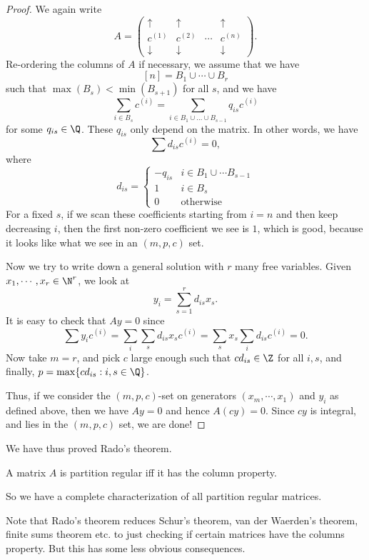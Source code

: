\documentclass[a4paper]{article}
\begin{document}
\begin{proof}
  We again write
  \[
    A =
    \begin{pmatrix}
      \uparrow & \uparrow & & \uparrow\\
      c^{(1)} & c^{(2)} & \cdots & c^{(n)}\\
      \downarrow & \downarrow & & \downarrow
    \end{pmatrix}.
  \]
  Re-ordering the columns of $A$ if necessary, we assume that we have
  \[
    [n] = B_1 \cup \cdots \cup B_r
  \]
  such that $\max(B_s) < \min(B_{s + 1})$ for all $s$, and we have
  \[
    \sum_{i \in B_s} c^{(i)} = \sum_{i \in B_1 \cup \ldots \cup B_{s - 1}} q_{is}c^{(i)}
  \]
  for some $q_{is} \in \Q$. These $q_{is}$ only depend on the matrix. In other words, we have
  \[
    \sum d_{is} c^{(i)} = 0,
  \]
  where
  \[
    d_{is} =
    \begin{cases}
      -q_{is} & i \in B_1 \cup \cdots B_{s - 1}\\
      1 & i \in B_s\\
      0 & \text{otherwise}
    \end{cases}
  \]
  For a fixed $s$, if we scan these coefficients starting from $i = n$ and then keep decreasing $i$, then the first non-zero coefficient we see is $1$, which is good, because it looks like what we see in an $(m, p, c)$ set.

  Now we try to write down a general solution with $r$ many free variables. Given $x_1, \cdots, x_r \in \N^r$, we look at
  \[
    y_i = \sum_{s = 1}^r d_{is}x_s.
  \]
  It is easy to check that $Ay = 0$ since
  \[
    \sum y_i c^{(i)} = \sum_i \sum_s d_{is} x_s c^{(i)} = \sum_s x_s \sum_i d_{is} c^{(i)} = 0.
  \]
  Now take $m = r$, and pick $c$ large enough such that $c d_{is} \in \Z$ for all $i, s$, and finally, $p = \max \{c d_{is}: i, s \in \Q\}$.

  Thus, if we consider the $(m, p, c)$-set on generators $(x_m, \cdots, x_1)$ and $y_i$ as defined above, then we have $Ay = 0$ and hence $A(cy) = 0$. Since $cy$ is integral, and lies in the $(m, p, c)$ set, we are done!
\end{proof}

We have thus proved Rado's theorem.
\begin{thm}
  A matrix $A$ is partition regular iff it has the column property.
\end{thm}
So we have a complete characterization of all partition regular matrices.

Note that Rado's theorem reduces Schur's theorem, van der Waerden's theorem, finite sums theorem etc. to just checking if certain matrices have the columns property. But this has some less obvious consequences.
\end{document}
